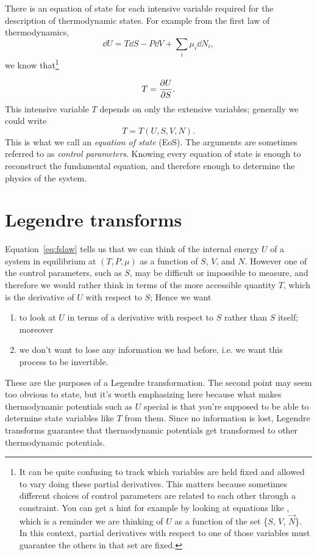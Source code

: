 There is an equation of state for each intensive variable required for the
description of thermodynamic states. For example from the
first law of thermodynamics,
\begin{equation}\label{eq:fslaw}
  \dd{U}=T\dd{S}-P\dd{V}+\sum_i\mu_i\dd{N}_i,
\end{equation}
we know that\footnote{It can be quite confusing to track which variables
are held fixed and allowed to vary doing these partial derivatives.
This matters because sometimes different choices of control parameters
are related to each other through a constraint.
You can get a hint for example by looking at equations like
, which is a reminder we are thinking of
$U$ as a function of the set \{$S$, $V$, $\vec{N}$\}. In this context,
partial derivatives with respect to one of those variables must
guarantee the others in that set are fixed.}

\begin{equation}
  T=\pdv{U}{S}.
\end{equation}
This intensive variable $T$ depends on only the extensive variables; 
generally we could write
\begin{equation}
  T=T(U,S,V,N).
\end{equation}
This is what we call an {\it equation of state}
(EoS). The arguments are sometimes referred to as 
{\it control parameters}. Knowing every equation 
of state is enough to reconstruct the fundamental equation, and therefore 
enough to determine the physics of the system.

\section{Legendre transforms}

Equation~\eqref{eq:fslaw} tells us that we can think of the internal energy
$U$ of a system in equilibrium at $(T,P,\mu)$ as a function of $S$, $V$, and
$N$. However one of the control parameters, such as $S$, may be
difficult or impossible to measure, and therefore we would rather
think in terms of the more accessible quantity $T$, which 
is the derivative of $U$ with respect to $S$; 
Hence we want 
\begin{enumerate}
\item to look at $U$ in terms of a derivative with respect to $S$ rather 
      than $S$ itself; moreover 
\item we don't want to lose any information we had before, i.e. we want this
      process to be invertible. 
\end{enumerate}
These are the purposes of a Legendre transformation. The second point 
may seem too obvious to state, but it's worth emphasizing here because 
what makes thermodynamic potentials such as $U$ special is that you're 
supposed to be able to determine state variables like $T$ from them. 
Since no information is lost, Legendre transforms guarantee that 
thermodynamic potentials get transformed to other thermodynamic potentials.

